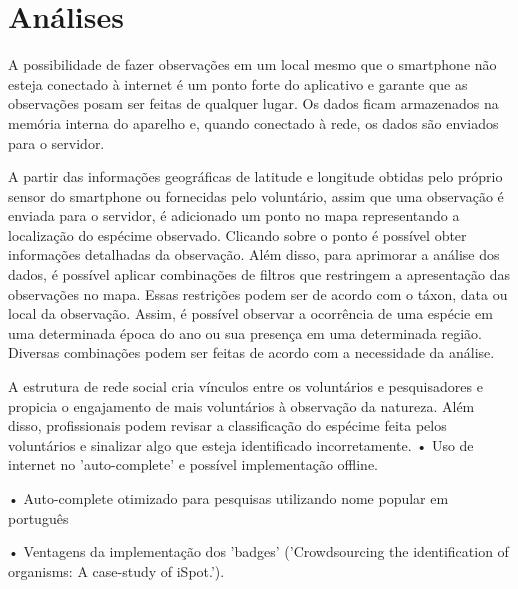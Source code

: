 \section*{Análises}
A possibilidade de fazer observações em um local mesmo que o smartphone não esteja conectado à internet é um ponto forte do aplicativo e garante que as observações posam ser feitas de qualquer lugar. Os dados ficam armazenados na memória interna do aparelho e, quando conectado à rede, os dados são enviados para o servidor.

A partir das informações geográficas de latitude e longitude obtidas pelo próprio sensor do smartphone ou fornecidas pelo voluntário, assim que uma observação é enviada para o servidor, é adicionado um ponto no mapa representando a localização do espécime observado. Clicando sobre o ponto é possível obter informações detalhadas da observação. Além disso, para aprimorar a análise dos dados, é possível aplicar combinações de filtros que restringem a apresentação das observações no mapa. Essas restrições podem ser de acordo com o táxon, data ou local da observação. Assim, é possível observar a ocorrência de uma espécie em uma determinada época do ano ou sua presença em uma determinada região. Diversas combinações podem ser feitas de acordo com a necessidade da análise.

A estrutura de rede social cria vínculos entre os voluntários e pesquisadores e propicia o engajamento de mais voluntários à observação da natureza. Além disso, profissionais podem revisar a classificação do espécime feita pelos voluntários e sinalizar algo que esteja identificado incorretamente.
• Uso de internet no 'auto-complete' e possível implementação offline.

• Auto-complete otimizado para pesquisas utilizando nome popular em português

• Ventagens da implementação dos 'badges' ('Crowdsourcing the identification of organisms: A case-study of iSpot.').